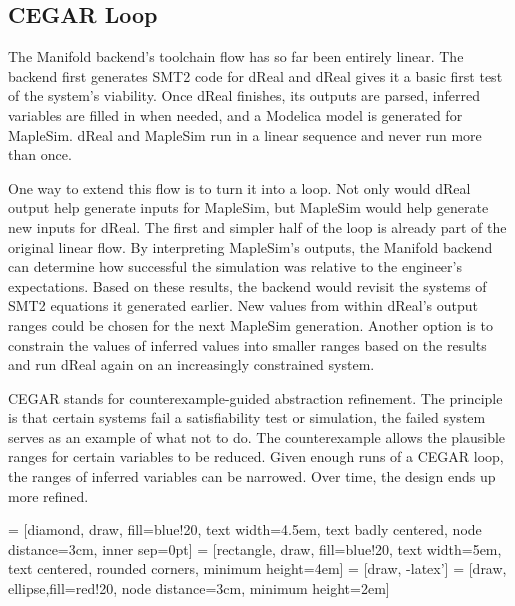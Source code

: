 \subsection{CEGAR Loop}

The Manifold backend's toolchain flow has so far been entirely linear.
The backend first generates SMT2 code for dReal and dReal gives it a basic first test of the system's viability.
Once dReal finishes, its outputs are parsed, inferred variables are filled in when needed, and a Modelica model is generated for MapleSim.
dReal and MapleSim run in a linear sequence and never run more than once.

One way to extend this flow is to turn it into a loop.
Not only would dReal output help generate inputs for MapleSim, but MapleSim would help generate new inputs for dReal.
The first and simpler half of the loop is already part of the original linear flow.
By interpreting MapleSim's outputs, the Manifold backend can determine how successful the simulation was relative to the engineer's expectations.
Based on these results, the backend would revisit the systems of SMT2 equations it generated earlier.
New values from within dReal's output ranges could be chosen for the next MapleSim generation.
Another option is to constrain the values of inferred values into smaller ranges based on the results and run dReal again on an increasingly constrained system.

CEGAR stands for counterexample-guided abstraction refinement.
The principle is that certain systems fail a satisfiability test or simulation, the failed system serves as an example of what not to do.
The counterexample allows the plausible ranges for certain variables to be reduced.
Given enough runs of a CEGAR loop, the ranges of inferred variables can be narrowed.
Over time, the design ends up more refined.

 = [diamond, draw, fill=blue!20, 
    text width=4.5em, text badly centered, node distance=3cm, inner sep=0pt]
 = [rectangle, draw, fill=blue!20, 
    text width=5em, text centered, rounded corners, minimum height=4em]
 = [draw, -latex']
 = [draw, ellipse,fill=red!20, node distance=3cm,
    minimum height=2em]
    
